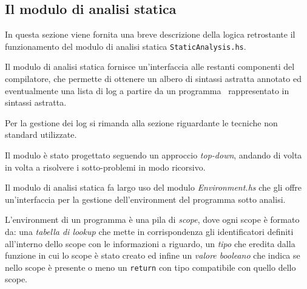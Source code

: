 \subsection{Il modulo di analisi statica}
In questa sezione viene fornita una breve descrizione della logica retrostante il funzionamento del modulo di analisi statica \texttt{StaticAnalysis.hs}.

Il modulo di analisi statica fornisce un'interfaccia alle restanti componenti del compilatore, che permette di ottenere un albero di sintassi astratta annotato ed eventualmente una lista di log a partire da un programma \SBF\ rappresentato in sintassi astratta.

Per la gestione dei log si rimanda alla sezione riguardante le tecniche non standard utilizzate.

Il modulo è stato progettato seguendo un approccio \textit{top-down}, andando di volta in volta a risolvere i sotto-problemi in modo ricorsivo.

Il modulo di analisi statica fa largo uso del modulo \textit{Environment.hs} che gli offre un'interfaccia per la gestione dell'environment del programma sotto analisi. 

L'environment di un programma è una pila di \textit{scope}, dove ogni scope è formato da: una \textit{tabella di lookup} che mette in corrispondenza gli identificatori definiti all'interno dello scope con le informazioni a riguardo, un \textit{tipo} che eredita dalla funzione in cui lo scope è stato creato ed infine un \textit{valore booleano} che indica se nello scope è presente o meno  un \texttt{return} con tipo compatibile con quello dello scope.

